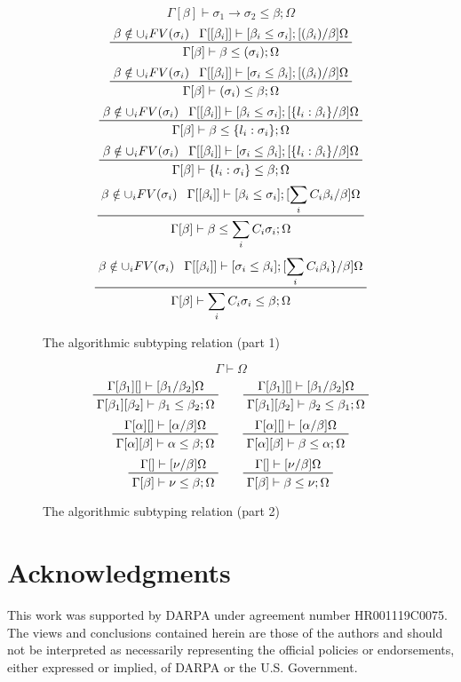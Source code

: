 \documentclass[letterpaper]{article}
\begin{document}
\begin{figure}
$$             {\Gamma[\beta]\vdash\sigma_1\rightarrow\sigma_2\leq\beta;\Omega} $$
  $$ \prftree{\prfassumption{\beta\notin\cup_iFV(\sigma_i)}}
             {\prfassumption{\Gamma[[\beta_i]]\vdash[\beta_i\leq\sigma_i];[(\beta_i)/\beta]\Omega}}
             {\Gamma[\beta]\vdash\beta\leq(\sigma_i);\Omega} $$
  $$ \prftree{\prfassumption{\beta\notin\cup_iFV(\sigma_i)}}
             {\prfassumption{\Gamma[[\beta_i]]\vdash[\sigma_i\leq\beta_i];[(\beta_i)/\beta]\Omega}}
             {\Gamma[\beta]\vdash(\sigma_i)\leq\beta;\Omega} $$
  $$ \prftree{\prfassumption{\beta\notin\cup_iFV(\sigma_i)}}
             {\prfassumption{\Gamma[[\beta_i]]\vdash[\beta_i\leq\sigma_i];[\{l_i:\beta_i\}/\beta]\Omega}}
             {\Gamma[\beta]\vdash\beta\leq\{l_i:\sigma_i\};\Omega} $$
  $$ \prftree{\prfassumption{\beta\notin\cup_iFV(\sigma_i)}}
             {\prfassumption{\Gamma[[\beta_i]]\vdash[\sigma_i\leq\beta_i];[\{l_i:\beta_i\}/\beta]\Omega}}
             {\Gamma[\beta]\vdash\{l_i:\sigma_i\}\leq\beta;\Omega} $$
  $$ \prftree{\prfassumption{\beta\notin\cup_iFV(\sigma_i)}}
             {\prfassumption{\Gamma[[\beta_i]]\vdash[\beta_i\leq\sigma_i];[\sum_iC_i\beta_i/\beta]\Omega}}
             {\Gamma[\beta]\vdash\beta\leq\sum_iC_i\sigma_i;\Omega} $$
  $$ \prftree{\prfassumption{\beta\notin\cup_iFV(\sigma_i)}}
             {\prfassumption{\Gamma[[\beta_i]]\vdash[\sigma_i\leq\beta_i];[\sum_iC_i\beta_i\}/\beta]\Omega}}
             {\Gamma[\beta]\vdash\sum_iC_i\sigma_i\leq\beta;\Omega} $$
  \caption{The algorithmic subtyping relation (part 1)}
  \label{f:subtyping1}
\end{figure}

\begin{figure}
  $$ \boxed{\Gamma\vdash\Omega} $$
  $$ $$
  $$ \prftree{\prfassumption{\Gamma[\beta_1][]\vdash[\beta_1/\beta_2]\Omega}}
             {\Gamma[\beta_1][\beta_2]\vdash\beta_1\leq\beta_2;\Omega}\qquad
     \prftree{\prfassumption{\Gamma[\beta_1][]\vdash[\beta_1/\beta_2]\Omega}}
             {\Gamma[\beta_1][\beta_2]\vdash\beta_2\leq\beta_1;\Omega} $$
  $$ \prftree{\prfassumption{\Gamma[\alpha][]\vdash[\alpha/\beta]\Omega}}
             {\Gamma[\alpha][\beta]\vdash\alpha\leq\beta;\Omega}\qquad
     \prftree{\prfassumption{\Gamma[\alpha][]\vdash[\alpha/\beta]\Omega}}
             {\Gamma[\alpha][\beta]\vdash\beta\leq\alpha;\Omega} $$
  $$ \prftree{\prfassumption{\Gamma[]\vdash[\nu/\beta]\Omega}}
             {\Gamma[\beta]\vdash\nu\leq\beta;\Omega}\qquad
     \prftree{\prfassumption{\Gamma[]\vdash[\nu/\beta]\Omega}}
             {\Gamma[\beta]\vdash\beta\leq\nu;\Omega} $$
  \caption{The algorithmic subtyping relation (part 2)}
  \label{f:subtyping2}
\end{figure}

\section*{Acknowledgments}
This work was supported by DARPA under agreement number HR001119C0075.
The views and conclusions contained herein are those of the authors
and should not be interpreted as necessarily representing the official
policies or endorsements, either expressed or implied, of DARPA or the
U.S. Government.



\end{document}
